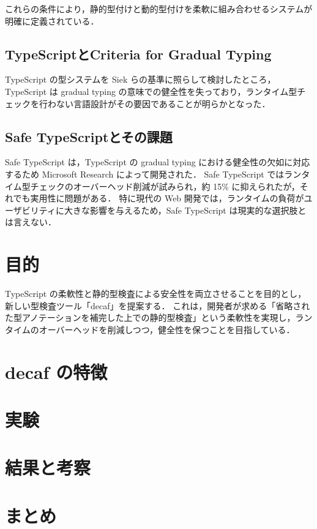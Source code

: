 \documentclass[11pt,twocolumn]{classes/yokou}
\begin{document}
これらの条件により，静的型付けと動的型付けを柔軟に組み合わせるシステムが明確に定義されている．

\subsection{TypeScriptとCriteria for Gradual Typing}

TypeScript の型システムを Siek らの基準に照らして検討したところ，TypeScript は gradual typing の意味での健全性を失っており，ランタイム型チェックを行わない言語設計がその要因であることが明らかとなった．

\subsection{Safe TypeScriptとその課題}

Safe TypeScript は，TypeScript の gradual typing における健全性の欠如に対応するため Microsoft Research によって開発された．
Safe TypeScript ではランタイム型チェックのオーバーヘッド削減が試みられ，約 15\% に抑えられたが，それでも実用性に問題がある．
特に現代の Web 開発では，ランタイムの負荷がユーザビリティに大きな影響を与えるため，Safe TypeScript は現実的な選択肢とは言えない．

\section{目的}

TypeScript の柔軟性と静的型検査による安全性を両立させることを目的とし，新しい型検査ツール「decaf」を提案する．
これは，開発者が求める「省略された型アノテーションを補完した上での静的型検査」という柔軟性を実現し，ランタイムのオーバーヘッドを削減しつつ，健全性を保つことを目指している．

\section{decaf の特徴}

\section{実験}

\section{結果と考察}

\section{まとめ}
\end{document}
